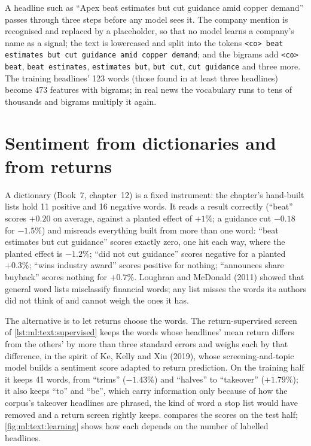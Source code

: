 A headline such as ``Apex beat estimates but cut guidance amid copper demand'' passes through three steps before any model
sees it. The company mention is recognised and replaced by a placeholder, so that no model learns a company's name as a
signal; the text is lowercased and split into the tokens \texttt{<co> beat estimates but cut guidance amid copper
demand}; and the bigrams add \texttt{<co> beat}, \texttt{beat estimates}, \texttt{estimates but}, \texttt{but cut},
\texttt{cut guidance} and three more. The training headlines' 123 words (those found in at least three headlines) become 473
features with bigrams; in real news the vocabulary runs to tens of thousands and bigrams multiply it again.

\section{Sentiment from dictionaries and from returns}

A dictionary (Book~7, chapter~12) is a fixed instrument: the chapter's hand-built lists hold 11 positive and 16 negative
words. It reads a result correctly (``beat'' scores $+0.20$ on average, against a planted effect of $+1\%$; a guidance cut
$-0.18$ for $-1.5\%$) and misreads everything built from more than one word: ``beat estimates but cut guidance'' scores
exactly zero, one hit each way, where the planted effect is $-1.2\%$; ``did not cut guidance'' scores negative for a
planted $+0.3\%$; ``wins industry award'' scores positive for nothing; ``announces share buyback'' scores nothing for
$+0.7\%$. Loughran and McDonald (2011) showed that general word lists misclassify financial words; any list misses the
words its authors did not think of and cannot weigh the ones it has.

The alternative is to let returns choose the words. The return-supervised screen of \cref{lst:ml:text:supervised} keeps the
words whose headlines' mean return differs from the others' by more than three standard errors and weighs each by that
difference, in the spirit of Ke, Kelly and Xiu (2019), whose screening-and-topic model builds a sentiment score adapted
to return prediction. On the training half it keeps 41 words, from ``trims'' ($-1.43\%$) and ``halves'' to ``takeover''
($+1.79\%$); it also keeps ``to'' and ``be'', which carry information only because of how the corpus's takeover
headlines are phrased, the kind of word a stop list would have removed and a return screen rightly keeps.
 compares the scores on the test half; \cref{fig:ml:text:learning} shows how each depends on the
number of labelled headlines.

